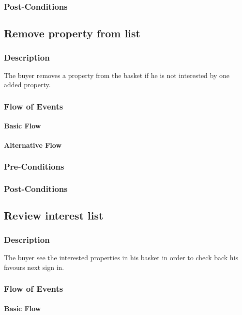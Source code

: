 \documentclass[a4paper,12pt]{article}
\begin{document}
\subsubsection{Post-Conditions}

\subsection{Remove property from list}
\subsubsection{Description}
The buyer removes a property from the basket if he is not interested by one added property.
\subsubsection{Flow of Events}
\paragraph{Basic Flow}
\begin{itemize}
\end{itemize}
\paragraph{Alternative Flow}
\begin{itemize}
\end{itemize}
\subsubsection{Pre-Conditions}
\subsubsection{Post-Conditions}

\subsection{Review interest list}
\subsubsection{Description}
The buyer see the interested properties in his basket in order to check back his favours next sign in.
\subsubsection{Flow of Events}
\paragraph{Basic Flow}
\begin{itemize}
\end{itemize}
\end{document}
